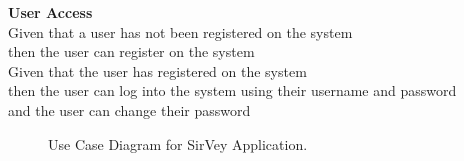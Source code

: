 \documentclass[12pt]{witseiepaper}
\begin{document}
\textbf{User Access}\\
Given that a user has not been registered on the system\\
then the user can register on the system\\

Given that the user has registered on the system\\
then the user can log into the system using their username and password\\
and the user can change their password\\

\newpage


\begin{figure}[H]
	\caption{Use Case Diagram for SirVey Application.} 
	\label{fig:UseCase}
\end{figure}

\newpage


\end{document}
